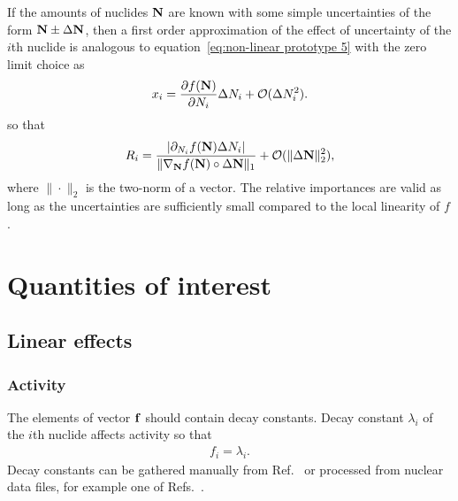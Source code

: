 If the amounts of nuclides $\mathbf{N}$ are known with some simple uncertainties of the form $\mathbf{N}\pm\Delta\mathbf{N}$, then a first order approximation of the effect of uncertainty of the $i$th nuclide is analogous to equation~\eqref{eq:non-linear prototype 5} with the zero limit choice as
%
\begin{gather}
x_i = \frac{\partial f(\mathbf{N})}{\partial N_i}\Delta N_i + \mathcal{O}(\Delta N_i^2).
\label{eq:uncertainty effect}
\end{gather}
%
so that
%
\begin{gather}
R_i %
    = \frac{\displaystyle\left|\partial_{N_i} f(\matvec{N})\Delta N_i\right|}{\|\nabla_\matvec{N}f(\matvec{N})\circ \Delta\matvec{N}\|_1} + \mathcal{O}(\|\Delta \matvec{N}\|_2^2),
\end{gather}
%
where $\|\cdot\|_2$ is the two-norm of a vector. The relative importances are valid as long as the uncertainties are sufficiently small compared to the local linearity of $f$.





\section{Quantities of interest}
\label{sect:quantities}

\subsection{Linear effects}



\subsubsection*{Activity}

The elements of vector $\mathbf{f}$ should contain decay constants. Decay constant $\lambda_i$ of the $i$th nuclide affects activity so that
%
\begin{gather}
f_i = \lambda_i.
\end{gather}
%
Decay constants can be gathered manually from Ref.~\cite{nndc} or processed from nuclear data files, for example one of Refs.~\cite{jendl,jeff,cendl,brond,endf}.

